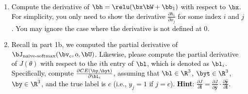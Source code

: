 \begin{parts}
\begin{enumerate}[label=\roman*.]
        \item \textcolor{black}{Compute the derivative of $\bh = \relu(\bx \bW + \bb_1)$ with respect to $\bx$. For simplicity, you only need to show the derivative $\frac{\partial h_i}{\partial x_j}$ for some index $i$ and $j$. You may ignore the case where the derivative is not defined at 0.}
        \newline
        \item \textcolor{black}{Recall in part 1b, we computed the partial derivative of $\bJ_{\text{naive-softmax}}(\bv_c, o, \bU)$. Likewise, please compute the partial derivative of $J(\theta)$ with respect to the $i$th entry of $\bl$, which is denoted as $\bl_i$. Specifically, compute $\frac{\partial CE(\by, \byt)}{\partial \bl_i}$, assuming that $\bl \in \R^3$, $\byt \in \R^3$, $\by \in \R^3$, and the true label is $c$ (i.e., $y_j=1$ if $j=c$).
        \textbf{Hint}:  $\frac{\partial J}{\partial \mathbf{l}} = \frac{\partial J}{\partial \hat{\mathbf{y}}} \cdot \frac{\partial \hat{\mathbf{y}}}{\partial \mathbf{l}}$.}
        \newline
\end{enumerate}
\end{parts}
